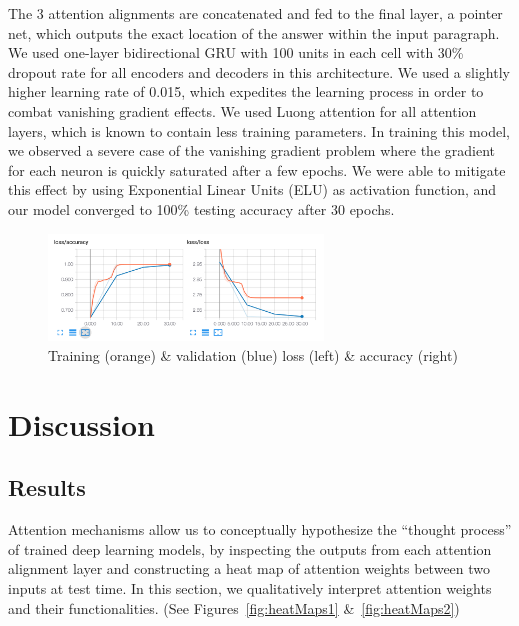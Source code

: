 \documentclass{article}
\begin{document}
The 3 attention alignments are concatenated and fed to the final layer, a pointer net, which outputs the exact location of the answer within the input paragraph. We used one-layer bidirectional GRU with 100 units in each cell with 30\% dropout rate for all encoders and decoders in this architecture. We used a slightly higher learning rate of 0.015, which expedites the learning process in order to combat vanishing gradient effects. We used Luong attention \cite{Luong} for all attention layers, which is known to contain less training parameters. In training this model, we observed a severe case of the vanishing gradient problem where the gradient for each neuron is quickly saturated after a few epochs. We were able to mitigate this effect by using Exponential Linear Units (ELU) \cite{ELU} as activation function, and our model converged to 100\% testing accuracy after 30 epochs.

\begin{figure}[h]
	\includegraphics[width=0.65\textwidth]{training.png}
	\centering
	\caption{Training (orange) \& validation (blue) loss (left) \& accuracy (right)}
\end{figure}

\section{Discussion} \label{discussion}

\subsection{Results}
Attention mechanisms allow us to conceptually hypothesize the ``thought process'' of trained deep learning models, by inspecting the outputs from each attention alignment layer and constructing a heat map of attention weights between two inputs at test time. In this section, we qualitatively interpret attention weights and their functionalities. (See Figures~\ref{fig:heatMaps1} \&~\ref{fig:heatMaps2})
\end{document}
